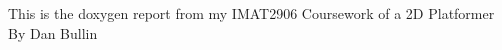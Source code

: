 This is the doxygen report from my I\+M\+A\+T2906 Coursework of a 2D Platformer~\newline
By Dan Bullin 